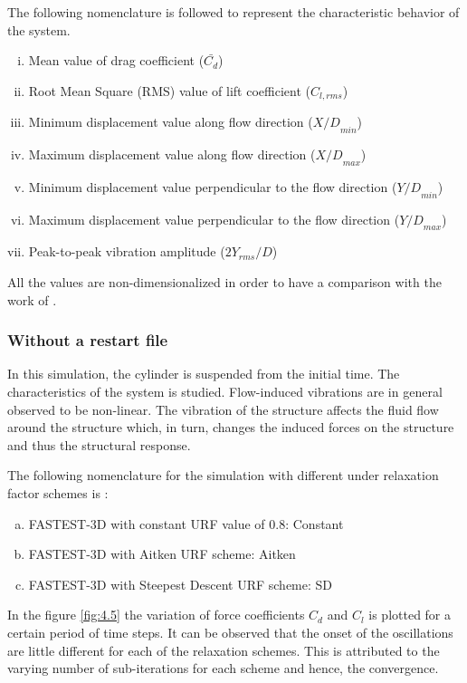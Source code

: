 The following nomenclature is followed to represent the characteristic behavior of the system.

\begin{enumerate}[(i)]
\item Mean value of drag coefficient ($\bar{C_d}$)
\item Root Mean Square (RMS) value of lift coefficient ($C_{l,rms}$)
\item Minimum displacement value along flow direction (${X/D}_{min}$)
\item Maximum displacement value along flow direction (${X/D}_{max}$)
\item Minimum displacement value perpendicular to the flow direction (${Y/D}_{min}$)
\item Maximum displacement value perpendicular to the flow direction (${Y/D}_{max}$)
\item Peak-to-peak vibration amplitude ($2 {Y_{rms}}/D$)
\end{enumerate}

All the values are non-dimensionalized in order to have a comparison with the work of \citet{zhou1999vortex}. 

\subsubsection{Without a restart file}
In this simulation, the cylinder is suspended from the initial time. The characteristics of the system is studied. Flow-induced vibrations are in general observed to be non-linear. The vibration of the structure affects the fluid flow around the structure which, in turn, changes the induced forces on the structure and thus the structural response. 

The following nomenclature for the simulation with different under relaxation factor schemes is :

\begin{enumerate}[(a)]
\item FASTEST-3D with constant URF value of 0.8: Constant
\item FASTEST-3D with Aitken URF scheme: Aitken
\item FASTEST-3D with Steepest Descent URF scheme: SD
\end{enumerate} 

In the figure \ref{fig:4.5} the variation of force coefficients $C_d$ and $C_l$ is plotted for a certain period of time steps. It can be observed that the onset of the oscillations are little different for each of the relaxation schemes. This is attributed to the varying number of sub-iterations for each scheme and hence, the convergence. 

